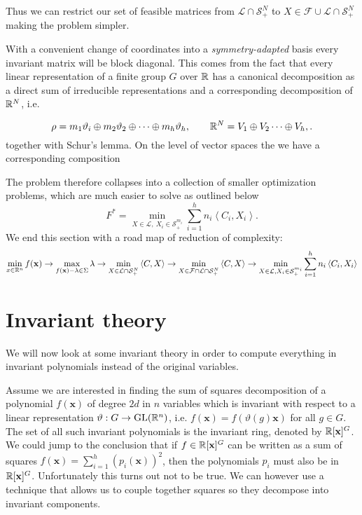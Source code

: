 \documentclass[]{article}
\begin{document}
Thus we can restrict our set of feasible matrices from $\mathcal{L}\cap \mathcal{S}_+^N$ to $ X\in\mathcal{F}\cup\mathcal{L}\cap \mathcal{S}_+^N$ making the problem simpler.

With a convenient change of coordinates into a \textit{symmetry-adapted} basis every invariant matrix will be block diagonal. This comes from the fact that every linear representation of a finite group $G$ over $\mathbb R$ has a canonical decomposition as a direct sum of irreducible representations and a corresponding decomposition of $\mathbb R^N$, i.e.

\[\rho = m_1\vartheta_i\oplus m_2\vartheta_2 \oplus \cdots \oplus m_h\vartheta_h, \quad \quad \mathbb R^N = V_1\oplus V_2 \cdots \oplus V_h,.\]
together with Schur's lemma. 
On the level of vector spaces the we have a corresponding composition


The problem therefore collapses into a collection of smaller 
optimization problems, which are much easier to solve as outlined below 
\[F^\ast = \min_{X\in\mathcal{L},~X_i \in \mathcal{S}_+^{m_i} }\sum_{i=1}^{h} n_i\left<C_i,X_i\right>.\]
We end this section with a road map of reduction of complexity:
\[\min_{x\in\mathbb R^n}f(\mathbf{x}) \rightarrow \max_{f(\mathbf{x})-\lambda\in \Sigma} \lambda \rightarrow\min_{X\in\mathcal{L}\cap \mathcal{S}_+^N } \left<C,X\right> \rightarrow 
\min_{X\in\mathcal{F}\cap\mathcal{L}\cap \mathcal{S}_+^N } \left<C,X\right> \rightarrow
\min_{X\in\mathcal{L}, X_i \in \mathcal{S}_+^{m_i} }\sum_{i=1}^{h} n_i\left<C_i,X_i\right>\]

\section*{Invariant theory}
We will now look at some invariant theory in order to compute everything in invariant polynomials instead of the original variables.

Assume we are interested in finding the sum of squares decomposition of a polynomial $f(\textbf{x})$ of degree $2d$ in $n$
variables which is invariant with respect to a linear representation $\vartheta:G\rightarrow \mathrm{GL}(\mathbb R^n)$, i.e. $f(\textbf{x}) = f(\vartheta(g)\textbf{x})$ for all $g\in G$.
The set of all such invariant polynomials is the invariant ring, denoted by $\mathbb R[\textbf{x}]^G$. We could jump to the conclusion that if $f\in \mathbb R[\textbf{x}]^G$ can be written as a 
sum of squares $f(\textbf{x}) =\sum_{i=1}^{h}(p_i(\textbf{x}))^2$, then the polynomials $p_i$ must also be in $\mathbb R[\mathbf{x}]^G$. Unfortunately this turns out not to be true. We can however
use a technique that allows us to couple together squares so they decompose into invariant components.
\end{document}

